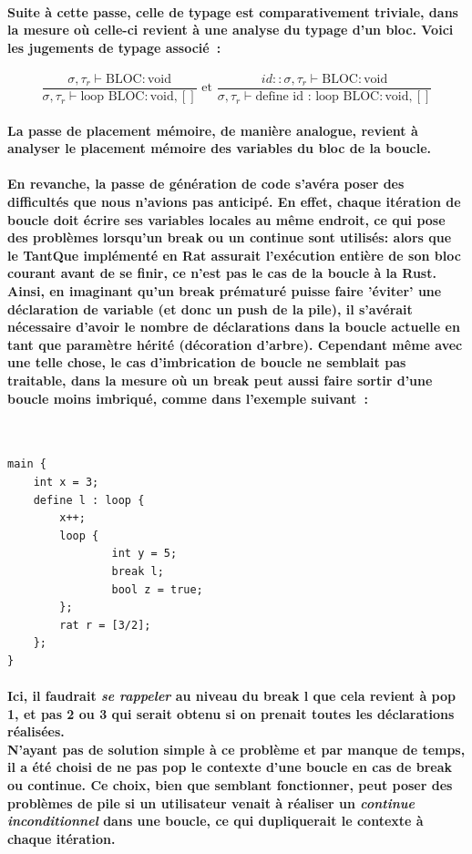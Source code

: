 \documentclass[french]{article}
\newcommand{\jugementLoop}{
        \dfrac{\sigma, \tau_r \vdash \text{BLOC} : \text{void}}
              {\sigma, \tau_r \vdash \text{loop} \text{ BLOC} : \text{void}, []}
        }
\newcommand{\jugementLoopId}{
        \dfrac{id::\sigma, \tau_r \vdash \text{BLOC} : \text{void}}
              {\sigma, \tau_r \vdash \text{define id : loop} \text{ BLOC} : \text{void}, []}
        }
\begin{document}
\paragraph*{Suite à cette passe, celle de typage est comparativement triviale, dans la mesure où celle-ci revient à une analyse
du typage d'un bloc. Voici les jugements de typage associé~:}
 \[\jugementLoop \text{ et } \jugementLoopId\]
\paragraph*{La passe de placement mémoire, de manière analogue, revient à analyser le placement mémoire des variables du bloc de la boucle.}
\paragraph*{En revanche, la passe de génération de code s'avéra poser des difficultés que nous n'avions pas anticipé. En effet, chaque itération de boucle doit
écrire ses variables locales au même endroit, ce qui pose des problèmes lorsqu'un break ou un continue sont utilisés: alors que le TantQue
implémenté en Rat assurait l'exécution entière de son bloc courant avant de se finir, ce n'est pas le cas de la boucle à la Rust. \\
Ainsi, en imaginant qu'un break prématuré puisse faire 'éviter' une déclaration de variable (et donc un push de la pile), il s'avérait nécessaire
d'avoir le nombre de déclarations dans la boucle actuelle en tant que paramètre hérité (décoration d'arbre). Cependant même avec une telle chose, 
le cas d'imbrication de boucle ne semblait pas traitable, dans la mesure où un break peut aussi faire sortir d'une boucle moins imbriqué, comme dans 
l'exemple suivant~:}

\, %
\begin{lstlisting}[language=ratcode]
main {
    int x = 3;
    define l : loop {
        x++;
        loop {
                int y = 5;
                break l;
                bool z = true;
        };
        rat r = [3/2];
    };
}
\end{lstlisting}
\paragraph*{Ici, il faudrait \textit{se rappeler} au niveau du break l que cela revient à pop 1, et pas 2 ou 3 qui serait obtenu si on prenait toutes les déclarations réalisées.\\
N'ayant pas de solution simple à ce problème et par manque de temps, il a été choisi de ne \textbf{pas} pop le contexte d'une boucle en cas de break ou continue.
Ce choix, bien que semblant fonctionner, peut poser des problèmes de pile si un utilisateur venait à réaliser un \textit{continue inconditionnel} dans une boucle, 
ce qui dupliquerait le contexte à chaque itération.}
\end{document}
